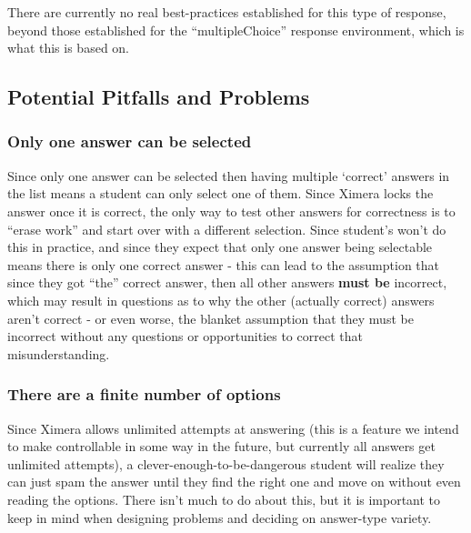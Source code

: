 \documentclass{ximera}
\begin{document}
        There are currently no real best-practices established for this type of response, beyond those established for the ``multipleChoice'' response environment, which is what this is based on.
        
        

    \subsection*{Potential Pitfalls and Problems}
    
        
        \subsubsection*{Only one answer can be selected}
            Since only one answer can be selected then having multiple `correct' answers in the list means a student can only select one of them. Since Ximera locks the answer once it is correct, the only way to test other answers for correctness is to ``erase work'' and start over with a different selection. Since student's won't do this in practice, and since they expect that only one answer being selectable means there is only one correct answer - this can lead to the assumption that since they got ``the'' correct answer, then all other answers \textbf{must be} incorrect, which may result in questions as to why the other (actually correct) answers aren't correct - or even worse, the blanket assumption that they must be incorrect without any questions or opportunities to correct that misunderstanding.
            
        \subsubsection*{There are a finite number of options}
            Since Ximera allows unlimited attempts at answering (this is a feature we intend to make controllable in some way in the future, but currently all answers get unlimited attempts), a clever-enough-to-be-dangerous student will realize they can just spam the answer until they find the right one and move on without even reading the options. There isn't much to do about this, but it is important to keep in mind when designing problems and deciding on answer-type variety.
            
\end{document}
